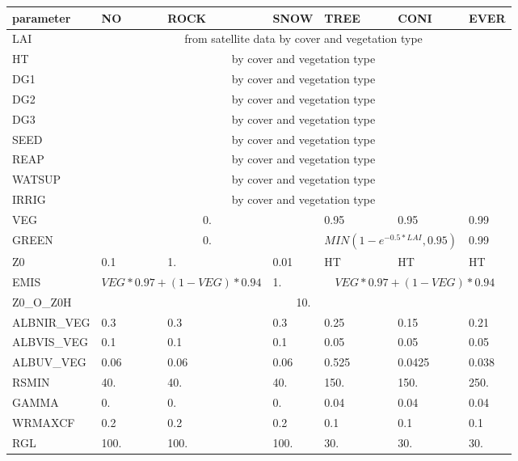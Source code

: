 \begin{table}[htbp]
\begin{center}
\begin{tabular}{|l|l|l|l|l|l|l| }
\hline
\textbf{parameter} & \textbf{NO} & \textbf{ROCK} & \textbf{SNOW} & \textbf{TREE} & \textbf{CONI} & \textbf{EVER} \\
\hline
LAI & \multicolumn{6}{|c|}{from satellite data by cover and vegetation type} \\
\hline
HT &  \multicolumn{6}{|c|}{by cover and vegetation type} \\
\hline
DG1 & \multicolumn{6}{|c|}{by cover and vegetation type} \\
\hline
DG2 & \multicolumn{6}{|c|}{by cover and vegetation type} \\
\hline
DG3 & \multicolumn{6}{|c|}{by cover and vegetation type} \\
\hline
SEED & \multicolumn{6}{|c|}{by cover and vegetation type} \\
\hline
REAP & \multicolumn{6}{|c|}{by cover and vegetation type} \\
\hline
WATSUP & \multicolumn{6}{|c|}{by cover and vegetation type} \\
\hline
IRRIG & \multicolumn{6}{|c|}{by cover and vegetation type} \\
\hline
VEG & \multicolumn{3}{|c|}{0.} & 0.95 & 0.95 & 0.99 \\
\hline
GREEN & \multicolumn{3}{|c|}{0.}  & \multicolumn{2}{|c|}{$MIN(1-e^{-0.5*LAI},0.95)$} & 0.99 \\
\hline
Z0 & 0.1 & 1. & 0.01 & HT & HT & HT  \\
\hline
EMIS & \multicolumn{2}{|c|}{$VEG*0.97+(1-VEG)*0.94$} & 1. &  \multicolumn{3}{|c|}{$VEG*0.97+(1-VEG)*0.94$} \\
\hline
Z0\_O\_Z0H & \multicolumn{6}{|c|}{10.} \\
\hline
ALBNIR\_VEG & 0.3 & 0.3 & 0.3 & 0.25 & 0.15 & 0.21 \\
\hline
ALBVIS\_VEG & 0.1 & 0.1 & 0.1 & 0.05 & 0.05 & 0.05\\
\hline
ALBUV\_VEG & 0.06 & 0.06 & 0.06 & 0.525 & 0.0425 & 0.038 \\
\hline
RSMIN & 40. & 40. & 40. & 150. & 150. & 250. \\
\hline
GAMMA & 0. & 0. & 0. & 0.04 & 0.04 & 0.04 \\
\hline
WRMAXCF & 0.2 & 0.2 & 0.2 & 0.1 & 0.1 & 0.1 \\
\hline
RGL & 100. & 100. & 100. & 30. & 30. & 30. \\

\end{tabular}
\end{center}
\end{table}
